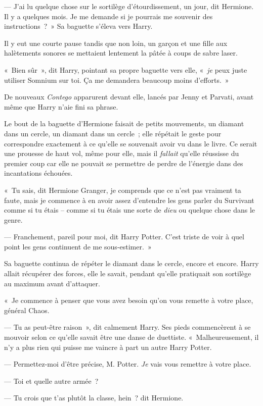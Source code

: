 --- J'ai lu quelque chose sur le sortilège d'étourdissement, un jour, dit Hermione. Il y a quelques mois. Je me demande si je pourrais me souvenir des instructions~?~» Sa baguette s'éleva vers Harry.

Il y eut une courte pause tandis que non loin, un garçon et une fille aux halètements sonores se mettaient lentement la pâtée à coups de sabre laser.

«~Bien sûr~», dit Harry, pointant sa propre baguette vers elle, «~\emph{je} peux juste utiliser Somnium sur toi. Ça me demandera beaucoup moins d'efforts.~»

De nouveaux \emph{Contego} apparurent devant elle, lancés par Jenny et Parvati, avant même que Harry n'aie fini sa phrase.

Le bout de la baguette d'Hermione faisait de petits mouvements, un diamant dans un cercle, un diamant dans un cercle~; elle répétait le geste pour correspondre exactement à ce qu'elle se souvenait avoir vu dans le livre. Ce serait une prouesse de haut vol, même pour elle, mais il \emph{fallait} qu'elle réussisse du premier coup car elle ne pouvait se permettre de perdre de l'énergie dans des incantations échouées.

«~Tu sais, dit Hermione Granger, je comprends que ce n'est pas vraiment ta faute, mais je commence à en avoir assez d'entendre les gens parler du Survivant comme si tu étais -- comme si tu étais une sorte de \emph{dieu} ou quelque chose dans le genre.

--- Franchement, pareil pour moi, dit Harry Potter. C'est triste de voir à quel point les gens continuent de me sous-estimer.~»

Sa baguette continua de répéter le diamant dans le cercle, encore et encore. Harry allait récupérer des forces, elle le savait, pendant qu'elle pratiquait son sortilège au maximum avant d'attaquer.

«~Je commence à penser que vous avez besoin qu'on vous remette à votre place, général Chaos.

--- Tu as peut-être raison~», dit calmement Harry. Ses pieds commencèrent à se mouvoir selon ce qu'elle savait être une danse de duettiste. «~Malheureusement, il n'y a plus rien qui puisse me vaincre à part un autre Harry Potter.

--- Permettez-moi d'être précise, M. Potter. \emph{Je} vais vous remettre à votre place.

--- Toi et quelle autre armée~?

--- Tu crois que t'as plutôt la classe, hein~? dit Hermione.

